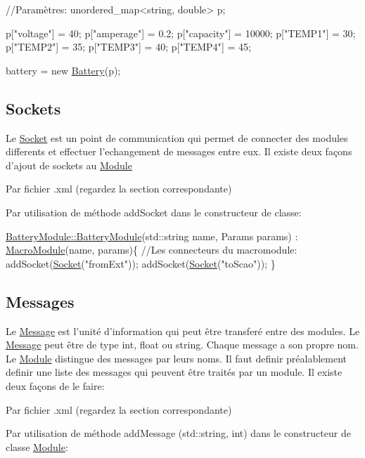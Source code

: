\begin{DoxyCode}
\textcolor{comment}{//Paramètres:}
unordered\_map<string, double> p;

p[\textcolor{stringliteral}{"voltage"}] = 40;
p[\textcolor{stringliteral}{"amperage"}] = 0.2;
p[\textcolor{stringliteral}{"capacity"}] = 10000;
p[\textcolor{stringliteral}{"TEMP1"}] = 30;
p[\textcolor{stringliteral}{"TEMP2"}] = 35;
p[\textcolor{stringliteral}{"TEMP3"}] = 40;
p[\textcolor{stringliteral}{"TEMP4"}] = 45;

battery = \textcolor{keyword}{new} \hyperlink{classBattery}{Battery}(p);
\end{DoxyCode}
\hypertarget{R_xC3_xA9f_xC3_xA9rence_sockets}{}\subsection{Sockets}\label{R_xC3_xA9f_xC3_xA9rence_sockets}
Le \hyperlink{classSocket}{Socket} est un point de communication qui permet de connecter des modules differents et effectuer l'echangement de messages entre eux. Il existe deux façons d'ajout de sockets au \hyperlink{classModule}{Module} \begin{DoxyItemize}
\item Par fichier .xml (regardez la section correspondante) \item Par utilisation de méthode add\-Socket dans le constructeur de classe\-: 
\begin{DoxyCode}
\hyperlink{classBatteryModule_a2fb494ef5f124c38c0fdf9ccfb31918f}{BatteryModule::BatteryModule}(std::string name, 
      Params params) : \hyperlink{classMacroModule}{MacroModule}(name, params)\{
    \textcolor{comment}{//Les connecteurs du macromodule:}
    addSocket(\hyperlink{classSocket}{Socket}(\textcolor{stringliteral}{"fromExt"}));
    addSocket(\hyperlink{classSocket}{Socket}(\textcolor{stringliteral}{"toScao"}));
\}
\end{DoxyCode}
\end{DoxyItemize}
\hypertarget{R_xC3_xA9f_xC3_xA9rence_messages}{}\subsection{Messages}\label{R_xC3_xA9f_xC3_xA9rence_messages}
Le \hyperlink{classMessage}{Message} est l'unité d'information qui peut être transferé entre des modules. Le \hyperlink{classMessage}{Message} peut être de type int, float ou string. Chaque message a son propre nom. Le \hyperlink{classModule}{Module} distingue des messages par leurs noms. Il faut definir préalablement definir une liste des messages qui peuvent être traités par un module. Il existe deux façons de le faire\-: \begin{DoxyItemize}
\item Par fichier .xml (regardez la section correspondante) \item Par utilisation de méthode {\ttfamily add\-Message (std\-::string, int)} dans le constructeur de classe \hyperlink{classModule}{Module}\-:\end{DoxyItemize}

